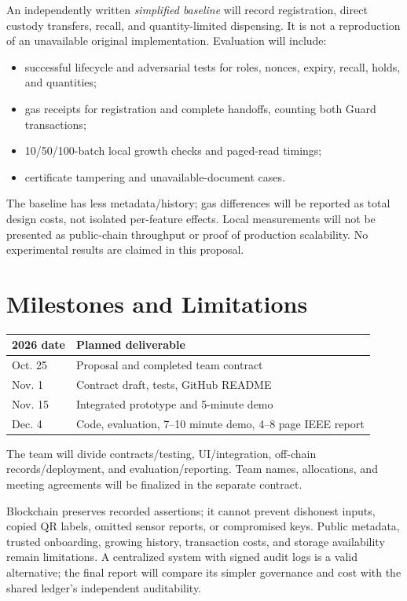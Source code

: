 \documentclass[10pt,twocolumn,letterpaper]{article}
\begin{document}
An independently written \emph{simplified baseline} will record registration, direct custody transfers, recall, and quantity-limited dispensing. It is not a reproduction of an unavailable original implementation. Evaluation will include:
\begin{itemize}
\item successful lifecycle and adversarial tests for roles, nonces, expiry, recall, holds, and quantities;
\item gas receipts for registration and complete handoffs, counting both Guard transactions;
\item 10/50/100-batch local growth checks and paged-read timings;
\item certificate tampering and unavailable-document cases.
\end{itemize}
The baseline has less metadata/history; gas differences will be reported as total design costs, not isolated per-feature effects. Local measurements will not be presented as public-chain throughput or proof of production scalability. No experimental results are claimed in this proposal.

\section{Milestones and Limitations}
\begin{center}\small
\begin{tabularx}{\columnwidth}{@{}lX@{}}
\toprule
\textbf{2026 date} & \textbf{Planned deliverable}\\\midrule
Oct. 25 & Proposal and completed team contract\\
Nov. 1 & Contract draft, tests, GitHub README\\
Nov. 15 & Integrated prototype and 5-minute demo\\
Dec. 4 & Code, evaluation, 7--10 minute demo, 4--8 page IEEE report\\\bottomrule
\end{tabularx}\end{center}
The team will divide contracts/testing, UI/integration, off-chain records/deployment, and evaluation/reporting. Team names, allocations, and meeting agreements will be finalized in the separate contract.

Blockchain preserves recorded assertions; it cannot prevent dishonest inputs, copied QR labels, omitted sensor reports, or compromised keys. Public metadata, trusted onboarding, growing history, transaction costs, and storage availability remain limitations. A centralized system with signed audit logs is a valid alternative; the final report will compare its simpler governance and cost with the shared ledger's independent auditability.
\end{document}
